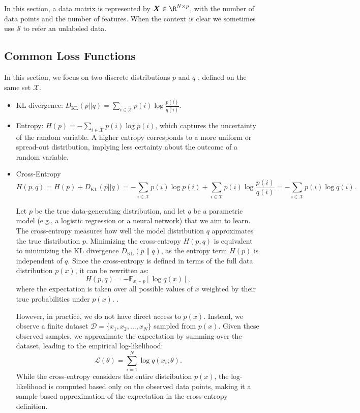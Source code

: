 

In this section, a data matrix is represented by $\bm{X} \in \R^{\ndata \times \nfeat}$, with \ndata the number of data points and \nfeat the number of features. 
When the context is clear we sometimes use $\mathcal{S}$ to refer an unlabeled data. 

\subsection{Common Loss Functions}
In this section, we focus on two discrete distributions $p$ and $q$ , defined on the same set $\mathcal{X}$.
    \begin{itemize}
        \item KL divergence: $D_\text{KL}(p || q) = \sum_{i \in \mathcal{X}}^{}{p(i) \log \frac{p(i)}{q(i)}}$.
        \item Entropy:  $H(p) = -\sum_{i \in \mathcal{X}}^{}{p(i) \log p(i)}$, which captures the uncertainty of the random variable. 
        A higher entropy corresponds to a more uniform or spread-out distribution, implying less certainty about the outcome of a random variable.
\item Cross-Entropy
\begin{equation*}
   H(p, q) = H(p) + D_\text{KL}(p || q) =  -\sum_{i \in \mathcal{X}} p(i) \log p(i) + \sum_{i \in \mathcal{X}} p(i) \log \frac{p(i)}{q(i)} =  -\sum_{i \in \mathcal{X}} p(i) \log q(i).
\end{equation*}

Let \( p \) be the true data-generating distribution, and let \( q \) be a parametric model (e.g., a logistic regression or a neural network) that we aim to learn. The cross-entropy measures how well the model distribution \( q \) approximates the true distribution \( p \). Minimizing the cross-entropy \( H(p, q) \) is equivalent to minimizing the KL divergence \( D_{\text{KL}}(p \| q) \), as the entropy term \( H(p) \) is independent of \( q \).
Since the cross-entropy is defined in terms of the full data distribution \( p(x) \), it can be rewritten as:
\begin{equation*}
   H(p, q) = -\mathbb{E}_{x \sim p} [\log q(x)],
\end{equation*}
where the expectation is taken over all possible values of \( x \) weighted by their true probabilities under \( p(x) \). .

However, in practice, we do not have direct access to \( p(x) \). Instead, we observe a finite dataset \( \mathcal{D} = \{x_1, x_2, \dots, x_N\} \) sampled from \( p(x) \). Given these observed samples, we approximate the expectation by summing over the dataset, leading to the empirical log-likelihood:
\begin{equation*}
   \mathcal{L}(\theta) = \sum_{i=1}^{N} \log q(x_i; \theta).
\end{equation*}
While the cross-entropy considers the entire distribution \( p(x) \), the log-likelihood is computed based only on the observed data points, making it a sample-based approximation of the expectation in the cross-entropy definition.



\end{itemize}
